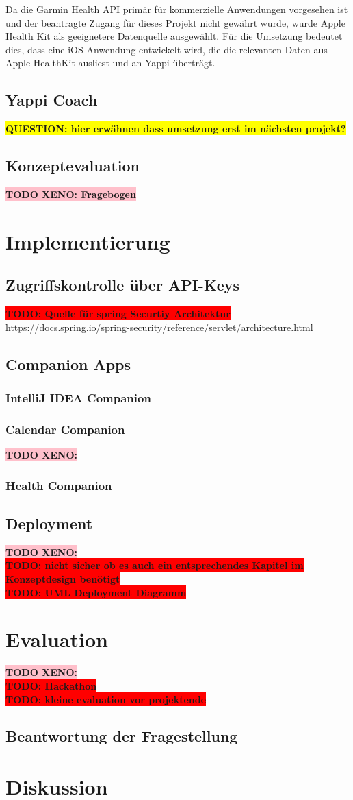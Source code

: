 \documentclass[12pt,a4paper]{report}
\newcommand{\todo}[1]{\colorbox{red}{\textbf{TODO: #1}}\\}
\newcommand{\question}[1]{\colorbox{yellow}{\textbf{QUESTION: #1}}\\}
\newcommand{\xeno}[1]{\colorbox{pink}{\textbf{TODO XENO: #1}}\\}
\begin{document}
Da die Garmin Health API primär für kommerzielle Anwendungen vorgesehen ist und der beantragte Zugang für dieses Projekt nicht
gewährt wurde, wurde Apple Health Kit als geeignetere Datenquelle ausgewählt. Für die Umsetzung bedeutet dies, dass eine
iOS-Anwendung entwickelt wird, die die relevanten Daten aus Apple HealthKit ausliest und an Yappi überträgt.

\section{Yappi Coach}
\question{hier erwähnen dass umsetzung erst im nächsten projekt?}
\section{Konzeptevaluation}
\xeno{Fragebogen}

\chapter{Implementierung}
\section{Zugriffskontrolle über API-Keys}

\todo{Quelle für spring Securtiy Architektur}
https://docs.spring.io/spring-security/reference/servlet/architecture.html

\section{Companion Apps}
\subsection{IntelliJ IDEA Companion}
\subsection{Calendar Companion}
\xeno{}
\subsection{Health Companion}
\section{Deployment}
\xeno{}
\todo{nicht sicher ob es auch ein entsprechendes Kapitel im Konzeptdesign benötigt}
\todo{UML Deployment Diagramm}

\chapter{Evaluation}
\xeno{}
\todo{Hackathon}
\todo{kleine evaluation vor projektende}
\section{Beantwortung der Fragestellung}

\chapter{Diskussion}

\printbibliography
\end{document}
